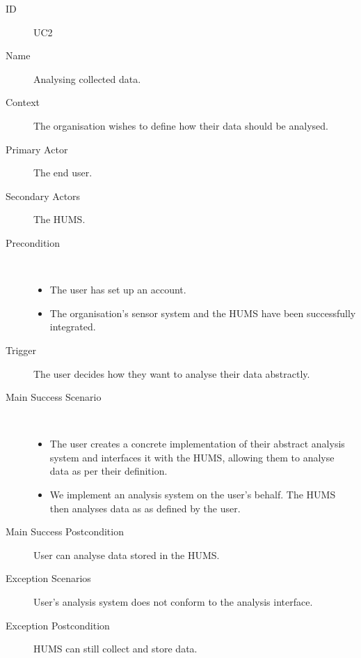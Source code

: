 \documentclass[10pt,a4paper]{article}
\begin{document}
\vspace{\baselineskip}

\begin{description}
	\item[ID] UC2
	\item[Name] Analysing collected data.
	\item[Context] The organisation wishes to define how their data should be
	               analysed.
	\item[Primary Actor] The end user.
	\item[Secondary Actors] The HUMS.
	\item[Precondition] ~
			\begin{itemize}
				\item The user has set up an account.
				\item The organisation's sensor system and the HUMS have been
				      successfully integrated.
			\end{itemize}
	\item[Trigger] The user decides how they want to analyse their data
	               abstractly.
	\item[Main Success Scenario] ~
			\begin{itemize}
				\item The user creates a concrete implementation of their abstract
				      analysis system and interfaces it with the HUMS, allowing them to
				      analyse data as per their definition.
				\item We implement an analysis system on the user's behalf. The HUMS
				      then analyses data as as defined by the user.
			\end{itemize}
	\item[Main Success Postcondition] User can analyse data stored in the HUMS.
	\item[Exception Scenarios] User's analysis system does not conform to the
			analysis interface.
	\item[Exception Postcondition] HUMS can still collect and store data.
\end{description}

\vspace{\baselineskip}
\end{document}
